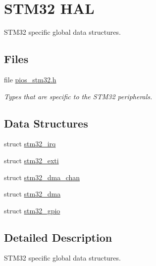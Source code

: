 \hypertarget{group___p_i_o_s___s_t_m32}{\section{S\-T\-M32 H\-A\-L}
\label{group___p_i_o_s___s_t_m32}
}


S\-T\-M32 specific global data structures.  


\subsection*{Files}
\begin{DoxyCompactItemize}
\item 
file \hyperlink{pios__stm32_8h}{pios\-\_\-stm32.\-h}
\begin{DoxyCompactList}\small\item\em Types that are specific to the S\-T\-M32 peripherals. \end{DoxyCompactList}\end{DoxyCompactItemize}
\subsection*{Data Structures}
\begin{DoxyCompactItemize}
\item 
struct \hyperlink{structstm32__irq}{stm32\-\_\-irq}
\item 
struct \hyperlink{structstm32__exti}{stm32\-\_\-exti}
\item 
struct \hyperlink{structstm32__dma__chan}{stm32\-\_\-dma\-\_\-chan}
\item 
struct \hyperlink{structstm32__dma}{stm32\-\_\-dma}
\item 
struct \hyperlink{structstm32__gpio}{stm32\-\_\-gpio}
\end{DoxyCompactItemize}


\subsection{Detailed Description}
S\-T\-M32 specific global data structures. 